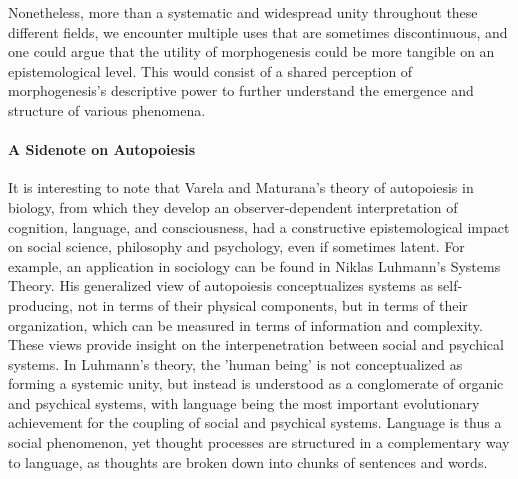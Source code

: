 \documentclass[fleqn,10pt]{wlscirep}
\begin{document}
Nonetheless, more than a systematic and widespread unity throughout these different fields, we encounter multiple uses that are sometimes discontinuous, and one could argue that the utility of morphogenesis could be more tangible on an epistemological level. This would consist of a shared perception of morphogenesis’s descriptive power to further understand the emergence and structure of various phenomena.

\paragraph*{A Sidenote on Autopoiesis}

It is interesting to note that Varela and Maturana’s theory of autopoiesis in biology, from which they develop an observer-dependent interpretation of cognition, language, and consciousness, had a constructive epistemological impact on social science, philosophy and psychology, even if sometimes latent. For example, an application in sociology can be found in Niklas Luhmann's Systems Theory. His generalized view of autopoiesis conceptualizes systems as self-producing, not in terms of their physical components, but in terms of their organization, which can be measured in terms of information and complexity\cite{gershenson_requisite_2014}. These views provide insight on the interpenetration between social and psychical systems. In Luhmann's theory, the 'human being' is not conceptualized as forming a systemic unity, but instead is understood as a conglomerate of organic and psychical systems, with language being the most important evolutionary achievement for the coupling of social and psychical systems. Language is thus a social phenomenon, yet thought processes are structured in a complementary way to language, as thoughts are broken down into chunks of sentences and words. \cite{seidl_luhmanns_2004}
\end{document}
